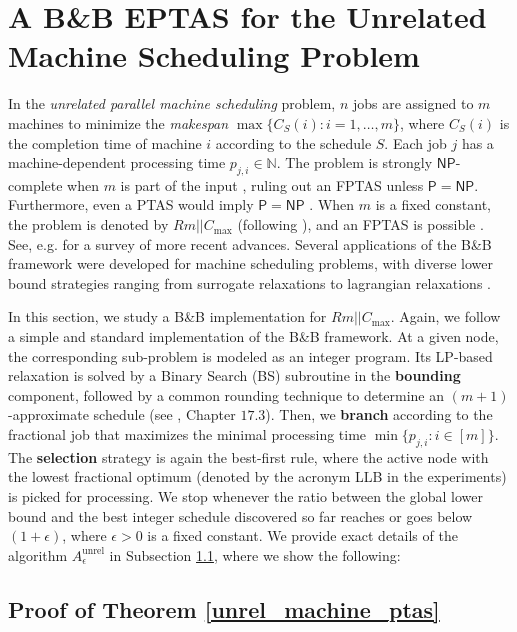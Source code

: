 \documentclass[a4paper,UKenglish,cleveref, autoref, thm-restate, pdfa]{lipics-v2021}
\theoremstyle{plain}
\begin{document}
\section{A B\&B EPTAS for the Unrelated Machine Scheduling Problem}\label{sec:js_ptas}

In the \emph{unrelated parallel machine scheduling} problem, $n$ jobs are assigned to $m$ machines to minimize the \emph{makespan} $\max\{C_S(i) : i = 1, \dots, m\}$, where $C_S(i)$ is the completion time of machine $i$ according to the schedule $S$. Each job $j$ has a machine-dependent processing time $p_{j, i} \in \mathbb{N}$. The problem is strongly $\mathsf{NP}$-complete when $m$ is part of the input \cite{garey_johnson_1}, ruling out an FPTAS unless $\mathsf{P} = \mathsf{NP}$. Furthermore, even a PTAS would imply $\mathsf{P} = \mathsf{NP}$ \cite{lenstra_shmoys_tardos}. When $m$ is a fixed constant, the problem is denoted by $Rm || C_{\max}$ (following \cite{machine_scheduling_review}), and an FPTAS is possible \cite{horowitz_sahni_job_fptas,grouping_1}. See, e.g. \cite{job_survey} for a survey of more recent advances. Several applications of the B\&B framework were developed for machine scheduling problems, with diverse lower bound strategies ranging from surrogate relaxations \cite{van_de_velde} to lagrangian relaxations \cite{martello_soumis_toth}.  

In this section, we study a B\&B implementation for $Rm || C_{\max}$.
Again, we follow a simple and standard implementation of the B\&B framework. At a given node, the corresponding sub-problem is modeled as an integer program. Its LP-based relaxation is solved by a Binary Search (BS) subroutine in the \textbf{bounding} component, followed by a common rounding technique to determine an $(m+1)$-approximate schedule (see \cite{vazirani}, Chapter $17.3$). Then, we \textbf{branch} according to the fractional job that maximizes the minimal processing time $\min \{p_{j, i}: i \in [m]\}$. The \textbf{selection} strategy is again the best-first rule, where the active node with the lowest fractional optimum (denoted by the acronym LLB in the experiments) is picked for processing. We stop whenever the ratio between the global lower bound and the best integer schedule discovered so far reaches or goes below $(1+\epsilon)$, where $\epsilon>0$ is a fixed constant. We provide exact details of the algorithm $A^{\text{unrel}}_{\epsilon}$ in Subsection \ref{sec:js_ptas_proof}, where we show the following:

\unrel
 
\subsection{Proof of Theorem \ref{unrel_machine_ptas}}\label{sec:js_ptas_proof}
\end{document}
